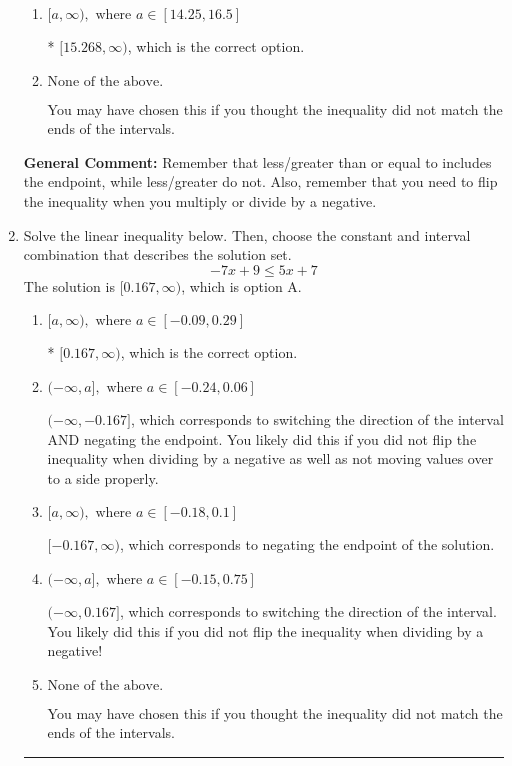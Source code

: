 \documentclass{extbook}[14pt]
\newcommand{\litem}[1]{\item #1

\rule{\textwidth}{0.4pt}}
\begin{document}
\begin{enumerate}
{\begin{enumerate}[label=\Alph*.]
 $(-\infty, -15.268]$, which corresponds to switching the direction of the interval AND negating the endpoint. You likely did this if you did not flip the inequality when dividing by a negative as well as not moving values over to a side properly.
\item \( [a, \infty), \text{ where } a \in [14.25, 16.5] \)

* $[15.268, \infty)$, which is the correct option.
\item \( \text{None of the above}. \)

You may have chosen this if you thought the inequality did not match the ends of the intervals.
\end{enumerate}

\textbf{General Comment:} Remember that less/greater than or equal to includes the endpoint, while less/greater do not. Also, remember that you need to flip the inequality when you multiply or divide by a negative.
}
\litem{
Solve the linear inequality below. Then, choose the constant and interval combination that describes the solution set.
\[ -7x + 9 \leq 5x + 7 \]The solution is \( [0.167, \infty) \), which is option A.\begin{enumerate}[label=\Alph*.]
\item \( [a, \infty), \text{ where } a \in [-0.09, 0.29] \)

* $[0.167, \infty)$, which is the correct option.
\item \( (-\infty, a], \text{ where } a \in [-0.24, 0.06] \)

 $(-\infty, -0.167]$, which corresponds to switching the direction of the interval AND negating the endpoint. You likely did this if you did not flip the inequality when dividing by a negative as well as not moving values over to a side properly.
\item \( [a, \infty), \text{ where } a \in [-0.18, 0.1] \)

 $[-0.167, \infty)$, which corresponds to negating the endpoint of the solution.
\item \( (-\infty, a], \text{ where } a \in [-0.15, 0.75] \)

 $(-\infty, 0.167]$, which corresponds to switching the direction of the interval. You likely did this if you did not flip the inequality when dividing by a negative!
\item \( \text{None of the above}. \)

You may have chosen this if you thought the inequality did not match the ends of the intervals.
\end{enumerate}

}
\end{enumerate}
\end{document}

